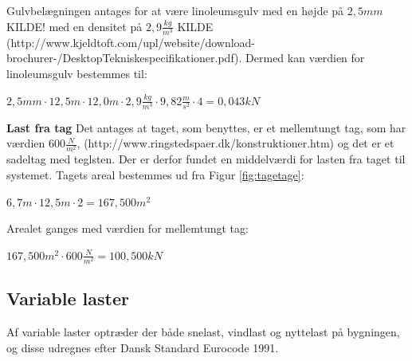 Gulvbelægningen antages for at være linoleumsgulv med en højde på $2,\!5 mm$ KILDE! med en densitet på $2,\!9 \frac{kg}{m^3}$ KILDE (http://www.kjeldtoft.com/upl/website/download-brochurer-/DesktopTekniskespecifikationer.pdf). Dermed kan værdien for linoleumsgulv bestemmes til:
\begin{center}
	$2,\!5 mm\cdot 12,\!5 m\cdot 12,\!0 m\cdot 2,\!9 \frac{kg}{m^3}\cdot 9,\!82 \frac{m}{s^2}\cdot 4=0,\!043 kN$
\end{center}

\textbf{Last fra tag}
\newline
Det antages at taget, som benyttes, er et mellemtungt tag, som har værdien $600 \frac{N}{m^2}$, (http://www.ringstedspaer.dk/konstruktioner.htm) og det er et sadeltag med teglsten. Der er derfor fundet en middelværdi for lasten fra taget til systemet. 
\newline
\newline
Tagets areal bestemmes ud fra Figur \ref{fig:tagetage}:
\begin{center}
	$6,\!7 m\cdot 12,\!5 m \cdot 2=167,\!500 m^2$
\end{center}

Arealet ganges med værdien for mellemtungt tag:
\begin{center}
	$167,\!500 m^2\cdot 600 \frac{N}{m^2}=100,\!500 kN$
\end{center}

\subsection{Variable laster}
Af variable laster optræder der både snelast, vindlast og nyttelast på bygningen, og disse udregnes efter Dansk Standard Eurocode 1991.

